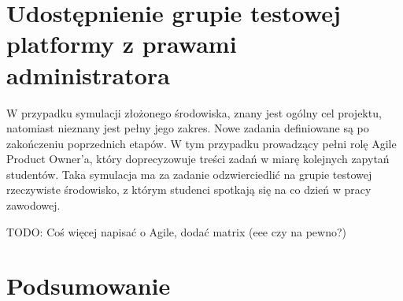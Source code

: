 \section{Udostępnienie grupie testowej platformy z prawami administratora}


W przypadku symulacji złożonego środowiska, znany jest ogólny cel projektu, natomiast nieznany jest pełny jego zakres.
Nowe zadania definiowane są po zakończeniu poprzednich etapów.
W tym przypadku prowadzący pełni rolę Agile Product Owner’a, który doprecyzowuje treści zadań w miarę kolejnych zapytań studentów.
Taka symulacja ma za zadanie odzwierciedlić na grupie testowej rzeczywiste środowisko, z którym studenci spotkają się na co dzień w pracy zawodowej.


TODO: Coś więcej napisać o Agile, dodać matrix (eee czy na pewno?)


\section{Podsumowanie}



